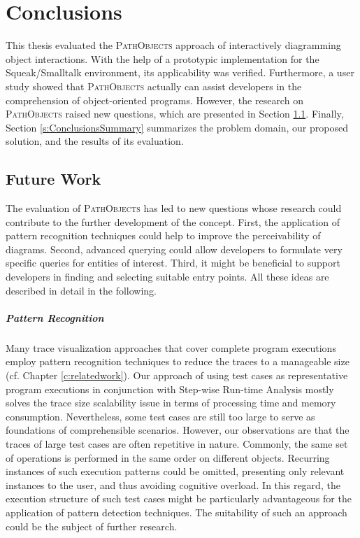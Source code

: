 \chapter{Conclusions}
\label{c:conclusions}
This thesis evaluated the \textsc{PathObjects} approach of interactively diagramming object interactions.
With the help of a prototypic implementation for the Squeak/Smalltalk environment, its applicability was verified.
Furthermore, a user study showed that \textsc{PathObjects} actually can assist developers in the comprehension of object-oriented programs.
However, the research on \textsc{PathObjects} raised new questions, which are presented in Section \ref{s:ConclusionsFuture}.
Finally, Section \ref{s:ConclusionsSummary} summarizes the problem domain, our proposed solution, and the results of its evaluation.

\section{Future Work}
\label{s:ConclusionsFuture}
The evaluation of \textsc{PathObjects} has led to new questions whose research could contribute to the further development of the concept.
First, the application of pattern recognition techniques could help to improve the perceivability of diagrams.
Second, advanced querying could allow developers to formulate very specific queries for entities of interest.
Third, it might be beneficial to support developers in finding and selecting suitable entry points.
All these ideas are described in detail in the following.

\paragraph{Pattern Recognition} Many trace visualization approaches that cover complete program executions employ pattern recognition techniques to reduce the traces to a manageable size (cf. Chapter \ref{c:relatedwork}).
Our approach of using test cases as representative program executions in conjunction with Step-wise Run-time Analysis mostly solves the trace size scalability issue in terms of processing time and memory consumption.
Nevertheless, some test cases are still too large to serve as foundations of comprehensible scenarios.
However, our observations are that the traces of large test cases are often repetitive in nature. Commonly, the same set of operations is performed in the same order on different objects.
Recurring instances of such execution patterns could be omitted, presenting only relevant instances to the user, and thus avoiding cognitive overload.
In this regard, the execution structure of such test cases might be particularly advantageous for the application of pattern detection techniques.
The suitability of such an approach could be the subject of further research.

